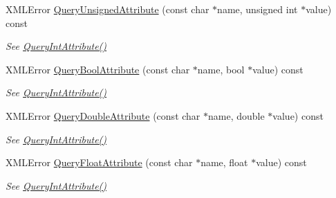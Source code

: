\begin{DoxyCompactItemize}
\item 
\mbox{\label{classtinyxml2_1_1XMLElement_a26fc84cbfba6769dafcfbf256c05e22f}} 
X\+M\+L\+Error \hyperlink{classtinyxml2_1_1XMLElement_a26fc84cbfba6769dafcfbf256c05e22f}{Query\+Unsigned\+Attribute} (const char $\ast$name, unsigned int $\ast$value) const
\begin{DoxyCompactList}\small\item\em See \hyperlink{classtinyxml2_1_1XMLElement_a8a78bc1187c1c45ad89f2690eab567b1}{Query\+Int\+Attribute()} \end{DoxyCompactList}\item 
\mbox{\label{classtinyxml2_1_1XMLElement_a14c1bb77c39689838be01838d86ca872}} 
X\+M\+L\+Error \hyperlink{classtinyxml2_1_1XMLElement_a14c1bb77c39689838be01838d86ca872}{Query\+Bool\+Attribute} (const char $\ast$name, bool $\ast$value) const
\begin{DoxyCompactList}\small\item\em See \hyperlink{classtinyxml2_1_1XMLElement_a8a78bc1187c1c45ad89f2690eab567b1}{Query\+Int\+Attribute()} \end{DoxyCompactList}\item 
\mbox{\label{classtinyxml2_1_1XMLElement_a5f0964e2dbd8e2ee7fce9beab689443c}} 
X\+M\+L\+Error \hyperlink{classtinyxml2_1_1XMLElement_a5f0964e2dbd8e2ee7fce9beab689443c}{Query\+Double\+Attribute} (const char $\ast$name, double $\ast$value) const
\begin{DoxyCompactList}\small\item\em See \hyperlink{classtinyxml2_1_1XMLElement_a8a78bc1187c1c45ad89f2690eab567b1}{Query\+Int\+Attribute()} \end{DoxyCompactList}\item 
\mbox{\label{classtinyxml2_1_1XMLElement_acd5eeddf6002ef90806af794b9d9a5a5}} 
X\+M\+L\+Error \hyperlink{classtinyxml2_1_1XMLElement_acd5eeddf6002ef90806af794b9d9a5a5}{Query\+Float\+Attribute} (const char $\ast$name, float $\ast$value) const
\begin{DoxyCompactList}\small\item\em See \hyperlink{classtinyxml2_1_1XMLElement_a8a78bc1187c1c45ad89f2690eab567b1}{Query\+Int\+Attribute()} \end{DoxyCompactList}\item 

\end{DoxyCompactItemize}
